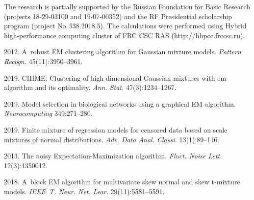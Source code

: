 



\Ack
\noindent
The research is partially supported by the Russian Foundation for Basic Research
(projects 18-29-03100 and 19-07-00352) and the RF Presidential 
scholarship program (project No.\,538.2018.5). The calculations were performed 
using Hybrid high-performance computing cluster of FRC CSC RAS 
({\sf http://hhpcc.frccsc.ru}).



  \begin{multicols}{2}

\renewcommand{\bibname}{\protect\rmfamily References}

{\small\frenchspacing
 {%
 \begin{thebibliography}{99}
 2012. A~robust EM clustering algorithm for 
Gaussian mixture models. \textit{Pattern Recogn.} 45(11):3950--3961.

 2019. CHIME: Clustering 
of high-dimensional Gaussian mixtures with em algorithm and its optimality. 
\textit{Ann. Stat.} 47(3):1234--1267.

 2019. 
Model selection in biological networks using a graphical EM algorithm. 
 \textit{Neurocomputing} 349:271--280.

 2019. Finite mixture of regression models for censored 
 data based on scale mixtures of normal distributions. 
  \textit{Adv. Data Anal. Classi.} 13(1):89--116.

 2013. 
The noisy Expectation-Maximization algorithm. 
 \textit{Fluct. Noise Lett.} 12(3):1350012.

 2018. 
A~block EM algorithm for multivariate skew normal and skew t-mixture models. 
 \textit{IEEE~T. Neur. Net. Lear.} 29(11):5581--5591.


\end{thebibliography}}}
\end{multicols}

